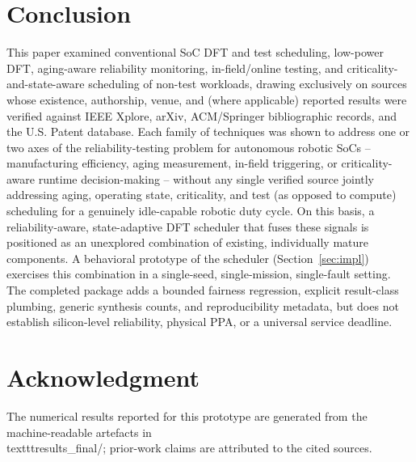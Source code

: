 \documentclass[journal]{IEEEtran}
\begin{document}
\section{Conclusion}
This paper examined conventional SoC DFT and test scheduling, low-power DFT, aging-aware reliability monitoring, in-field/online testing, and criticality-and-state-aware scheduling of non-test workloads, drawing exclusively on sources whose existence, authorship, venue, and (where applicable) reported results were verified against IEEE Xplore, arXiv, ACM/Springer bibliographic records, and the U.S. Patent database. Each family of techniques was shown to address one or two axes of the reliability-testing problem for autonomous robotic SoCs -- manufacturing efficiency, aging measurement, in-field triggering, or criticality-aware runtime decision-making -- without any single verified source jointly addressing aging, operating state, criticality, and test (as opposed to compute) scheduling for a genuinely idle-capable robotic duty cycle. On this basis, a reliability-aware, state-adaptive DFT scheduler that fuses these signals is positioned as an unexplored combination of existing, individually mature components. A behavioral prototype of the scheduler (Section~\ref{sec:impl}) exercises this combination in a single-seed, single-mission, single-fault setting. The completed package adds a bounded fairness regression, explicit result-class plumbing, generic synthesis counts, and reproducibility metadata, but does not establish silicon-level reliability, physical PPA, or a universal service deadline.

\section*{Acknowledgment}
The numerical results reported for this prototype are generated from the machine-readable artefacts in \\texttt{results_final/}; prior-work claims are attributed to the cited sources.
\end{document}
